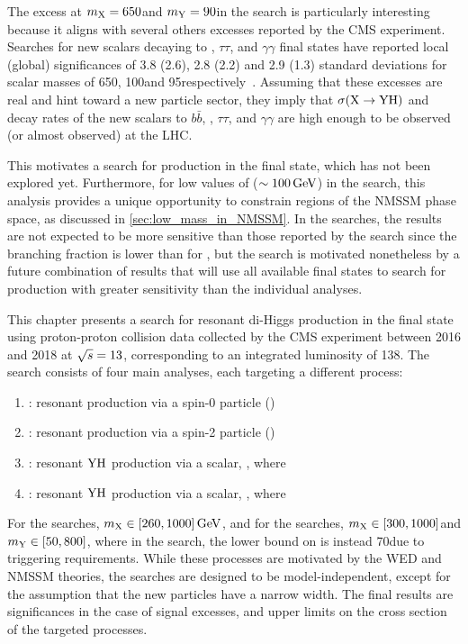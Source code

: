 The excess at $m_{\mathrm{X}}=650$\GeV and $m_{\mathrm{Y}}=90$\GeV in the \XYH search is particularly interesting because it aligns with several others excesses reported by the CMS experiment. Searches for new scalars decaying to \WW, $\tau\tau$, and $\gamma\gamma$ final states have reported local (global) significances of 3.8 (2.6), 2.8 (2.2) and 2.9 (1.3) standard deviations for scalar masses of 650\GeV, 100\GeV and 95\GeV respectively~\cite{CMS:2022bcb,CMS:2022goy,CMS:2024yhz}. Assuming that these excesses are real and hint toward a new particle sector, they imply that $\sigma(\mathrm{X} \to \mathrm{Y}\mathrm{H})$ and decay rates of the new scalars to $b\bar{b}$, \WW, $\tau\tau$, and $\gamma\gamma$ are high enough to be observed (or almost observed) at the LHC. 

This motivates a search for \XYH production in the \ggtt final state, which has not been explored yet. Furthermore, for low values of \mY ($\sim 100\,\text{Ge\hspace{-.08em}V}$) in the \Ygg search, this analysis provides a unique opportunity to constrain regions of the NMSSM phase space, as discussed in \cref{sec:low_mass_in_NMSSM}. In the \XHH searches, the results are not expected to be more sensitive than those reported by the \bbgg search since the \Htautau branching fraction is lower than for \Hbb, but the search is motivated nonetheless by a future combination of results that will use all available final states to search for \XHH production with greater sensitivity than the individual analyses.

This chapter presents a search for resonant di-Higgs production in the \ggtt final state using proton-proton collision data collected by the CMS experiment between 2016 and 2018 at $\sqrt{s}=13$\TeV, corresponding to an integrated luminosity of 138\fbinv. The search consists of four main analyses, each targeting a different process:
\begin{enumerate}
  \item \XZeroHH: resonant \HH production via a spin-0 particle (\XZero) 
  \item \XTwoHH: resonant \HH production via a spin-2 particle (\XTwo)
  \item \XYttHgg: resonant $\mathrm{Y}\mathrm{H}$ production via a scalar, \PX, where \Ytt
  \item \XYggHtt: resonant $\mathrm{Y}\mathrm{H}$ production via a scalar, \PX, where \Ygg
\end{enumerate}
For the \XHH searches, $m_{\mathrm{X}} \in [260, 1000]\,\text{Ge\hspace{-.08em}V}$, and for the \XYH searches, $m_{\mathrm{X}} \in [300, 1000]$\GeV and $m_{\mathrm{Y}} \in [50, 800]$, where in the \XYggHtt search, the lower bound on \mY is instead 70\GeV due to triggering requirements. While these processes are motivated by the WED and NMSSM theories, the searches are designed to be model-independent, except for the assumption that the new particles have a narrow width. The final results are significances in the case of signal excesses, and upper limits on the cross section of the targeted processes. 



